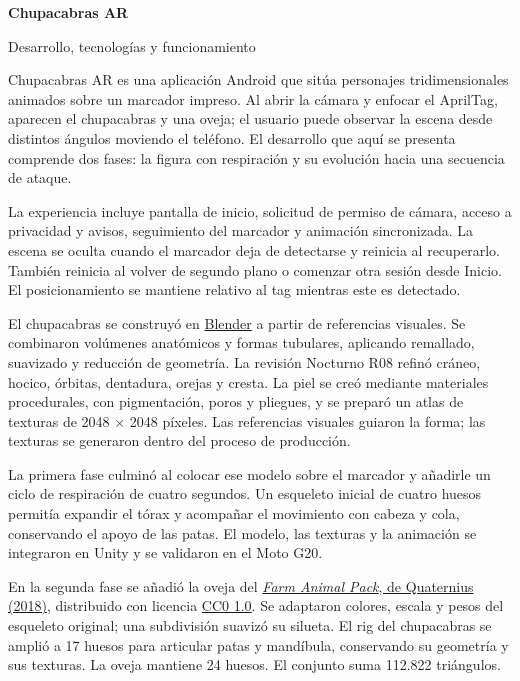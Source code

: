 \documentclass[11pt,letterpaper]{article}
\begin{document}
\color{ink}
{\sffamily\bfseries\fontsize{29}{34}\selectfont Chupacabras AR\par}
\vspace{3pt}
{\sffamily\fontsize{13}{17}\selectfont Desarrollo, tecnologías y funcionamiento\par}
\vspace{11pt}

Chupacabras AR es una aplicación Android que sitúa personajes tridimensionales animados sobre un marcador impreso. Al abrir la cámara y enfocar el AprilTag, aparecen el chupacabras y una oveja; el usuario puede observar la escena desde distintos ángulos moviendo el teléfono. El desarrollo que aquí se presenta comprende dos fases: la figura con respiración y su evolución hacia una secuencia de ataque.

La experiencia incluye pantalla de inicio, solicitud de permiso de cámara, acceso a privacidad y avisos, seguimiento del marcador y animación sincronizada. La escena se oculta cuando el marcador deja de detectarse y reinicia al recuperarlo. También reinicia al volver de segundo plano o comenzar otra sesión desde Inicio. El posicionamiento se mantiene relativo al tag mientras este es detectado.

El chupacabras se construyó en \href{https://www.blender.org/}{Blender} a partir de referencias visuales. Se combinaron volúmenes anatómicos y formas tubulares, aplicando remallado, suavizado y reducción de geometría. La revisión Nocturno R08 refinó cráneo, hocico, órbitas, dentadura, orejas y cresta. La piel se creó mediante materiales procedurales, con pigmentación, poros y pliegues, y se preparó un atlas de texturas de 2048 × 2048 píxeles. Las referencias visuales guiaron la forma; las texturas se generaron dentro del proceso de producción.

La primera fase culminó al colocar ese modelo sobre el marcador y añadirle un ciclo de respiración de cuatro segundos. Un esqueleto inicial de cuatro huesos permitía expandir el tórax y acompañar el movimiento con cabeza y cola, conservando el apoyo de las patas. El modelo, las texturas y la animación se integraron en Unity y se validaron en el Moto G20.

En la segunda fase se añadió la oveja del \href{https://quaternius.com/packs/farmanimal.html}{\textit{Farm Animal Pack}, de Quaternius (2018)}, distribuido con licencia \href{https://creativecommons.org/publicdomain/zero/1.0/}{CC0 1.0}. Se adaptaron colores, escala y pesos del esqueleto original; una subdivisión suavizó su silueta. El rig del chupacabras se amplió a 17 huesos para articular patas y mandíbula, conservando su geometría y sus texturas. La oveja mantiene 24 huesos. El conjunto suma 112.822 triángulos.
\end{document}
